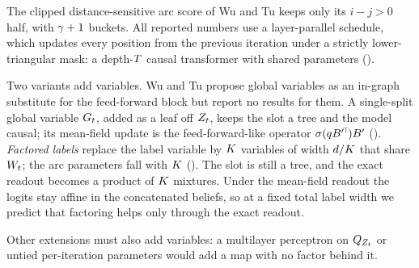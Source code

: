 The clipped distance-sensitive arc score of Wu and Tu keeps only its $i-j>0$ half, with
$\gamma+1$ buckets. All reported numbers use a layer-parallel schedule, which updates every
position from the previous iteration under a strictly lower-triangular mask: a depth-$T$
causal transformer with shared parameters ().

Two variants add variables. Wu and Tu propose global variables as an in-graph substitute for
the feed-forward block but report no results for them. A single-split global variable $G_{t}$, added as a leaf
off $Z_{t}$, keeps the slot a tree and the model causal; its mean-field update is the
feed-forward-like operator $\sigma(qB'^{\!\top}\!)B'$ ().
\emph{Factored labels} replace the label variable by $K$ variables of width $d/K$
that share $W_{t}$; the arc parameters fall with $K$ (). The slot is
still a tree, and the exact readout becomes a product of $K$ mixtures. Under the mean-field
readout the logits stay affine in the concatenated beliefs, so at a fixed total label width we
predict that factoring helps only through the exact readout.

Other extensions must also add variables: a multilayer perceptron on $Q_{Z_{t}}$ or untied
per-iteration parameters would add a map with no factor behind it.
